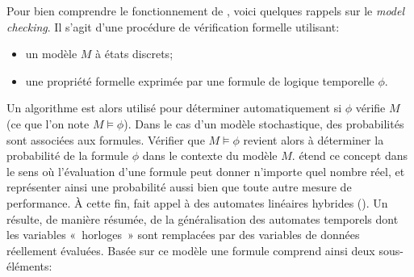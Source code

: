 Pour bien comprendre le fonctionnement de \lsah, voici quelques rappels sur le \textit{model checking}.
Il s'agit d'une procédure de vérification formelle utilisant:
\begin{itemize}
    \item un modèle $M$ à états discrets;
    \item une propriété formelle exprimée par une formule de logique temporelle $\phi$.
\end{itemize}
Un algorithme est alors utilisé pour déterminer automatiquement si $\phi$ vérifie $M$ (ce que l'on note $M\models\phi$).
Dans le cas d'un modèle stochastique, des probabilités sont associées aux formules.
Vérifier que $M\models\phi$ revient alors à déterminer la probabilité de la formule $\phi$ dans le contexte du modèle $M$.
\lsah étend ce concept dans le sens où l'évaluation d'une formule peut donner n'importe quel nombre réel, et représenter ainsi une probabilité aussi bien que toute autre mesure de performance.
À cette fin, \lsah fait appel à des automates linéaires hybrides (\alh).
Un \alh résulte, de manière résumée, de la généralisation des automates temporels dont les variables «~horloges~» sont remplacées par des variables de données réellement évaluées.
Basée sur ce modèle une formule \lsah comprend ainsi deux sous-éléments:
